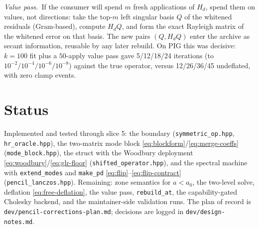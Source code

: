 \documentclass[11pt]{article}
\newcommand{\Hd}{H_d}
\begin{document}
\medskip
\noindent
\emph{Value pass.}\ If the consumer will spend $m$ fresh applications of
$\Hd$, spend them on values, not directions: take the top-$m$ left
singular basis $Q$ of the whitened residuals (Gram-based), compute
$\Hd Q$, and form the exact Rayleigh matrix of the whitened error on that
basis. The new pairs $(Q, \Hd Q)$ enter the archive as secant
information, reusable by any later rebuild. On PIG this was decisive:
$k{=}100$ fit plus a $50$-apply value pass gave 5/12/18/24 iterations (to
$10^{-2}/10^{-4}/10^{-6}/10^{-8}$) against the true operator, versus
12/26/36/45 undeflated, with zero clamp events.

\section{Status}

Implemented and tested through slice 5: the boundary
(\texttt{symmetric\_op.hpp}, \texttt{hr\_oracle.hpp}), the two-matrix
mode block \eqref{eq:blockform}/\eqref{eq:merge-coeffs}
(\texttt{mode\_block.hpp}), the struct with the Woodbury deployment
\eqref{eq:woodbury}/\eqref{eq:glr-floor}
(\texttt{shifted\_operator.hpp}), and the spectral machine with
\texttt{extend\_modes} and \texttt{make\_pd}
\eqref{eq:flip}--\eqref{eq:flip-contract}
(\texttt{pencil\_lanczos.hpp}). Remaining: zone semantics for $a < a_0$,
the two-level solve, deflation \eqref{eq:free-deflation}, the value pass,
\texttt{rebuild\_at}, the capability-gated Cholesky backend, and the
maintainer-side validation runs. The plan of record is
\texttt{dev/pencil-corrections-plan.md}; decisions are logged in
\texttt{dev/design-notes.md}.
\end{document}
